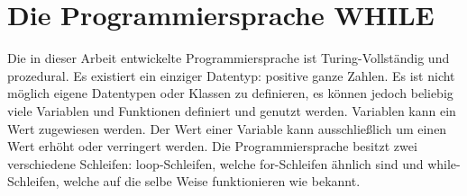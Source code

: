\chapter{Die Programmiersprache WHILE} \label{chap:while}

Die in dieser Arbeit entwickelte Programmiersprache ist Turing-Vollständig und prozedural. Es existiert ein einziger Datentyp: positive ganze Zahlen. Es ist nicht möglich eigene Datentypen oder Klassen zu definieren, es können jedoch beliebig viele Variablen und Funktionen definiert und genutzt werden. Variablen kann ein Wert zugewiesen werden. Der Wert einer Variable kann ausschließlich um einen Wert erhöht oder verringert werden. Die Programmiersprache besitzt zwei verschiedene Schleifen: loop-Schleifen, welche for-Schleifen ähnlich sind und while-Schleifen, welche auf die selbe Weise funktionieren wie bekannt. 


